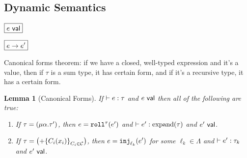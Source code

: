 \documentclass{article}
\let\originalleft\left
\let\originalright\right
\renewcommand{\left}{\mathopen{}\mathclose\bgroup\originalleft}
\renewcommand{\right}{\aftergroup\egroup\originalright}
\DeclareMathOperator{\expand}{\text{\normalfont expand}}
\newtheorem{Lemma}[Theorem]{Lemma}
\begin{document}
\newpage


\subsection{Dynamic Semantics}

$\boxed{\isval{e}}$

\begin{mathpar}

\end{mathpar}

\newpage

\noindent
$\boxed{e \smallstep e'}$

\begin{mathpar}





\end{mathpar}

Canonical forms theorem: if we have a closed, well-typed expression and it's a value,
then if $\tau$ is a sum type, it has certain form, and if it's a recursive type, it has a certain form.

\resetpfcounter
\begin{Lemma}[Canonical Forms]
  \label{thm:canonical forms}
  If $\hastype{e}{\tau}$
  and $\isval{e}$
  then all of the following are true:
  \begin{enumerate}
    \item
          If $\tau = \left( \rectype[\alpha][\tau'] \right)$,
          then $e = \roll{e'}$
          and $\hastype{e'}{\expand(\tau)}$
          and $\isval{e'}$.
    \item
          If $\tau = \left( \sumtype{C_i}{x_i}{C_i \in \C} \right)$,
          then $e = \inj[\ell_k]{e'}$ for some $\ell_k \in \Lambda$
          and $\hastype{e'}{\tau_k}$
          and $\isval{e'}$.
  \end{enumerate}
\end{Lemma}
\end{document}
